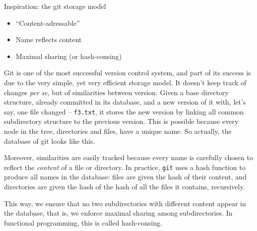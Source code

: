 \documentclass[ignorenonframetext,red]{beamer}
\begin{document}
\begin{frame}{Inspiration: the \textsf{git} storage model}
\begin{center}
\begin{overlayarea}{\textwidth}{12em}
    \end{overlayarea}
  \end{center}%
  \begin{itemize}\small %
  \item<7-> ``Content-adressable''%
  \item<8-> Name reflects content%
  \item<9-> Maximal sharing (or hash-consing)%
  \end{itemize}%
\end{frame}

\textsf{Git} is one of the most successful version control system, and
part of its success is due to the very simple, yet very efficient
storage model. It doesn't keep track of changes \emph{per se}, but of
similarities between version. Given a base directory structure,
already committed in its database, and a new version of it with, let's
say, one file changed -- \texttt{f3.txt}, it stores the new version by
linking all common subdirectory structure to the previous version.
This is possible because every node in the tree, directories and
files, have a unique name. So actually, the database of \textsf{git}
looks like this.

Moreover, similarities are easily tracked because every name is
carefully chosen to reflect the \emph{content} of a file or directory.
In practice, \texttt{git} uses a hash function to produce all names in
the database: files are given the hash of their content, and
directories are given the hash of the hash of all the files it
contains, recursively.

This way, we ensure that no two subdirectories with different content
appear in the database, that is, we enforce maximal sharing among
subdirectories. In functional programming, this is called
hash-consing.
\end{document}
